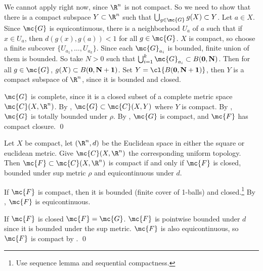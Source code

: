 We cannot apply  right now, since \(\R^n\) is not compact. So we need to show that there is a compact subspace \(Y \subset \R^n\) such that \(\bigcup_{g \in \mc{G}} g(X) \subset Y\). Let \(a \in X\). Since \(\mc{G}\) is equi\-continuous, there is a neighborhood \(U_a\) of \(a\) such that if \(x \in U_a\), then \(d(g(x), g(a)) < 1\) for all \(g \in \mc{G}\). \(X\) is compact, so choose a finite subcover \(\{U_{a_1}, \dots, U_{a_k}\}\). Since each \(\mc{G}_{a_i}\) is bounded, finite union of them is bounded. So take \(N > 0\) such that \(\bigcup_{i=1}^k \mc{G}_{a_i} \subset B(\bf{0}, N)\). Then for all \(g \in \mc{G}\), \(g(X) \subset B(\bf{0}, N+1)\). Set \(Y = \cl{B(\bf{0}, N+1)}\), then \(Y\) is a compact subspace of \(\R^n\), since it is bounded and closed.

\(\mc{G}\) is complete, since it is a closed subset of a complete metric space \(\mc{C}(X, \R^n)\). By , \(\mc{G} \subset \mc{C}(X, Y)\) where \(Y\) is compact. By , \(\mc{G}\) is totally bounded under \(\rho\). By , \(\mc{G}\) is compact, and \(\mc{F}\) has compact closure. \qed

 Let \(X\) be compact, let \((\R^n, d)\) be the Euclidean space in either the square or euclidean metric. Give \(\mc{C}(X, \R^n)\) the corresponding uniform topology. Then \(\mc{F} \subset \mc{C}(X, \R^n)\) is compact if and only if \(\mc{F}\) is closed, bounded under sup metric \(\rho\) and equicontinuous under \(d\).

\pf \note{\mimp} If \(\mc{F}\) is compact, then it is bounded (finite cover of 1-balls) and closed.\footnote{Use sequence lemma and sequential compactness.} By , \(\mc{F}\) is equicontinuous.

\note{\mimpd} If \(\mc{F}\) is closed \(\mc{F} = \mc{G}\). \(\mc{F}\) is pointwise bounded under \(d\) since it is bounded under the sup metric. \(\mc{F}\) is also equicontinuous, so \(\mc{F}\) is compact by . \qed

\pagebreak

